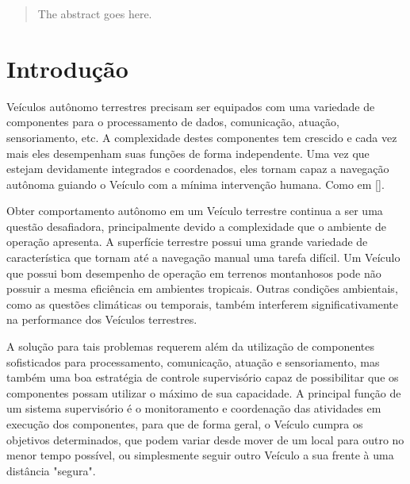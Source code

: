 \documentclass[conference]{IEEEtran}
\begin{document}

\maketitle
\begin{abstract}
The abstract goes here.
\end{abstract}





%
\IEEEpeerreviewmaketitle
\section{Introdução}\label{sec:introdução}\label{sec:introduction}

Veículos autônomo terrestres precisam ser equipados com uma variedade de componentes para o processamento de dados, comunicação, atuação, sensoriamento, etc. A complexidade destes componentes tem crescido e cada vez mais eles desempenham suas funções de forma independente. Uma vez que estejam devidamente integrados e coordenados, eles tornam capaz a navegação autônoma guiando o Veículo com a mínima intervenção humana.
Como em [].

Obter comportamento autônomo em um Veículo terrestre continua a ser uma questão desafiadora, principalmente devido a complexidade que o ambiente de operação apresenta. A superfície terrestre possui uma grande variedade de característica que tornam até a navegação manual uma tarefa difícil. Um Veículo que possui bom desempenho de operação em terrenos montanhosos pode não possuir a mesma eficiência em ambientes tropicais. Outras condições ambientais, como as questões climáticas ou temporais, também interferem significativamente na performance dos Veículos terrestres.

A solução para tais problemas requerem além da utilização de componentes sofisticados para processamento, comunicação, atuação e sensoriamento, mas também uma boa estratégia de controle supervisório capaz de possibilitar que os componentes possam utilizar o máximo de sua capacidade. A principal função de um sistema supervisório é o monitoramento e coordenação das atividades em execução dos componentes, para que de forma geral, o Veículo cumpra os objetivos determinados, que podem variar desde mover de um local para outro no menor tempo possível, ou simplesmente seguir outro Veículo a sua frente à uma distância "segura".
\end{document}
